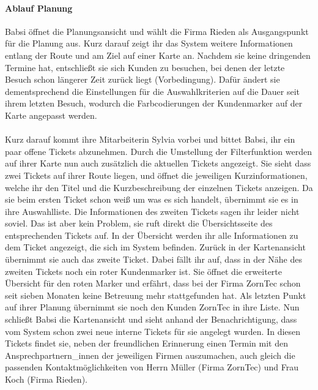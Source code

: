 \documentclass[Bachelorarbeit.tex]{subfiles}
\begin{document}
\paragraph*{Ablauf Planung}
Babsi öffnet die Planungsansicht und wählt die Firma Rieden als Ausgangspunkt für die Planung aus.
Kurz darauf zeigt ihr das System weitere Informationen entlang der Route und am Ziel auf einer Karte an.
Nachdem sie keine dringenden Termine hat, entschließt sie sich Kunden zu besuchen, bei denen der letzte Besuch schon längerer Zeit zurück liegt (Vorbedingung).
Dafür ändert sie dementsprechend die Einstellungen für die Auswahlkriterien auf die Dauer seit ihrem letzten Besuch, wodurch die Farbcodierungen der Kundenmarker auf der Karte angepasst werden.\\
\\
Kurz darauf kommt ihre Mitarbeiterin Sylvia vorbei und bittet Babsi, ihr ein paar offene Tickets abzunehmen. 
Durch die Umstellung der Filterfunktion werden auf ihrer Karte nun auch zusätzlich die aktuellen Tickets angezeigt.
Sie sieht dass zwei Tickets auf ihrer Route liegen, und öffnet die jeweiligen Kurzinformationen, welche ihr den Titel und die Kurzbeschreibung der einzelnen Tickets anzeigen. 
Da sie beim ersten Ticket schon weiß um was es sich handelt, übernimmt sie es in ihre Auswahlliste.
Die Informationen des zweiten Tickets sagen ihr leider nicht soviel. 
Das ist aber kein Problem, sie ruft direkt die Übersichtsseite des entsprechenden Tickets auf.
In der Übersicht werden ihr alle Informationen zu dem Ticket angezeigt, die sich im System befinden.
Zurück in der Kartenansicht übernimmt sie auch das zweite Ticket. 
Dabei fällt ihr auf, dass in der Nähe des zweiten Tickets noch ein roter Kundenmarker ist.
Sie öffnet die erweiterte Übersicht für den roten Marker und erfährt, dass bei der Firma ZornTec schon seit sieben Monaten keine Betreuung mehr stattgefunden hat.
Als letzten Punkt auf ihrer Planung übernimmt sie noch den Kunden ZornTec in ihre Liste. 
Nun schließt Babsi die Kartenansicht und sieht anhand der Benachrichtigung, dass vom System schon zwei neue interne Tickets für sie angelegt wurden.
In diesen Tickets findet sie, neben der freundlichen Erinnerung einen Termin mit den Ansprechpartnern\_innen der jeweiligen Firmen auszumachen, auch gleich die passenden Kontaktmöglichkeiten von Herrn Müller (Firma ZornTec) und Frau Koch (Firma Rieden).
\end{document}

